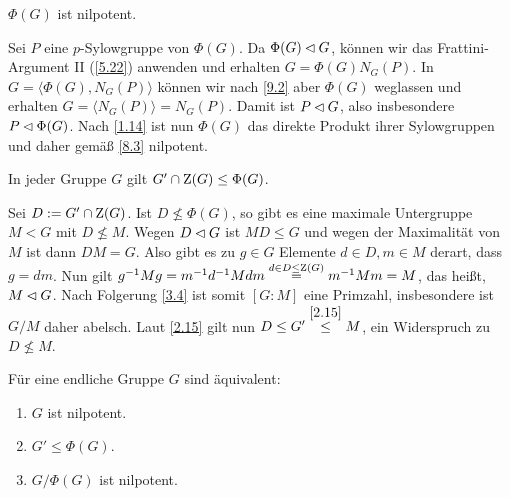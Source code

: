 \begin{satz}\label{9.5}
 $\Phi(G)$ ist nilpotent.
\end{satz}
\begin{beweis}
 Sei $P$ eine $p$-Sylowgruppe von $\Phi(G)$. Da $\Phi(G)\lhd G$, k\"onnen wir das Frattini-Argument II (\ref{5.22}) anwenden und erhalten $G=\Phi(G)N_G(P)$. In $G=\langle \Phi(G), N_G(P)\rangle$ k\"onnen wir nach \ref{9.2} aber $\Phi(G)$ weglassen und erhalten $G=\langle N_G(P)\rangle = N_G(P)$. Damit ist $P\lhd G$, also insbesondere $P\lhd \Phi(G)$. Nach \ref{1.14} ist nun $\Phi(G)$ das direkte Produkt ihrer Sylowgruppen und daher gem\"a\ss{} \ref{8.3} nilpotent.
\end{beweis}

\begin{satz}
 In jeder Gruppe $G$ gilt $G'\cap \operatorname{Z}(G)\leq \Phi(G)$.
\end{satz}
\begin{beweis}
 Sei $D:=G'\cap \operatorname{Z}(G)$. Ist $D\nleq\Phi(G)$, so gibt es eine maximale Untergruppe $M<G$ mit $D\nleq M$. Wegen $D\lhd G$ ist $MD\leq G$ und wegen der Maximalit\"at von $M$ ist dann $DM=G$. Also gibt es zu $g\in G$ Elemente $d\in D, m\in M$ derart, dass $g=dm$. Nun gilt $g^{-1}Mg=m^{-1}d^{-1}Mdm\stackrel{d\in D\leq \operatorname{Z}(G)}{=}m^{-1}Mm=M$, das hei\ss{}t, $M\lhd G$. Nach Folgerung \ref{3.4} ist somit $[G:M]$ eine Primzahl, insbesondere ist $G/M$ daher abelsch. Laut \ref{2.15} gilt nun $D\leq G'\stackrel{\ref{2.15}}{\leq}M$, ein Widerspruch zu $D\nleq M$.
\end{beweis}

\begin{satz}\label{9.7}
 F\"ur eine endliche Gruppe $G$ sind \"aquivalent:
\begin{enumerate}
 \item $G$ ist nilpotent.\label{9.7.1}
 \item $G'\leq \Phi(G)$.\label{9.7.2}
 \item $G/\Phi(G)$ ist nilpotent.\label{9.7.3}
\end{enumerate}

\end{satz}

